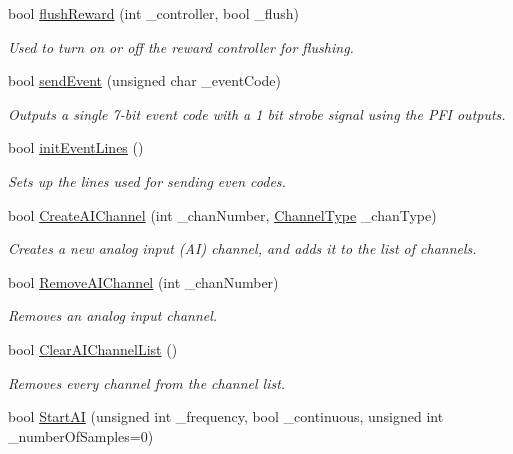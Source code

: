 \begin{DoxyCompactItemize}
bool \hyperlink{class_daq_board_a2be76f9d253a16b011c662122b18d11e}{flush\-Reward} (int \-\_\-controller, bool \-\_\-flush)
\begin{DoxyCompactList}\small\item\em Used to turn on or off the reward controller for flushing. \end{DoxyCompactList}\item 
bool \hyperlink{class_daq_board_a1929a34620c0dc6444af1da9d8b2a1cc}{send\-Event} (unsigned char \-\_\-event\-Code)
\begin{DoxyCompactList}\small\item\em Outputs a single 7-\/bit event code with a 1 bit strobe signal using the P\-F\-I outputs. \end{DoxyCompactList}\item 
bool \hyperlink{class_daq_board_a610fcba8cb7374e9ae7af1aa7aef027d}{init\-Event\-Lines} ()
\begin{DoxyCompactList}\small\item\em Sets up the lines used for sending even codes. \end{DoxyCompactList}\item 
bool \hyperlink{class_daq_board_ad3875492d646b11d129ac7547c00394b}{Create\-A\-I\-Channel} (int \-\_\-chan\-Number, \hyperlink{class_daq_board_adc04f1440c6e392e2c5da2340b9da420}{Channel\-Type} \-\_\-chan\-Type)
\begin{DoxyCompactList}\small\item\em Creates a new analog input (A\-I) channel, and adds it to the list of channels. \end{DoxyCompactList}\item 
bool \hyperlink{class_daq_board_a65249d3a2df5058a07e951a3a37008af}{Remove\-A\-I\-Channel} (int \-\_\-chan\-Number)
\begin{DoxyCompactList}\small\item\em Removes an analog input channel. \end{DoxyCompactList}\item 
bool \hyperlink{class_daq_board_aec9c7ccf9fc6ac59018f31a218ac1144}{Clear\-A\-I\-Channel\-List} ()
\begin{DoxyCompactList}\small\item\em Removes every channel from the channel list. \end{DoxyCompactList}\item 
bool \hyperlink{class_daq_board_a375d9d492b185f93a73330a93466f20d}{Start\-A\-I} (unsigned int \-\_\-frequency, bool \-\_\-continuous, unsigned int \-\_\-number\-Of\-Samples=0)

\end{DoxyCompactItemize}

